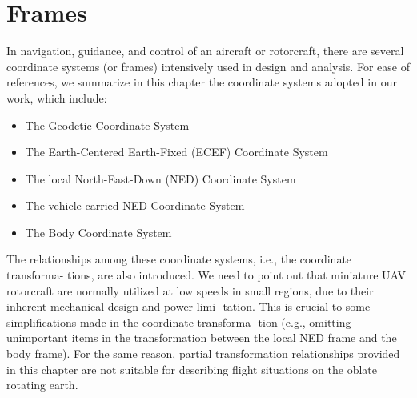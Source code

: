 \chapter{Frames}\label{ch:frames}

In navigation, guidance, and control of an aircraft or rotorcraft, there are several
coordinate systems (or frames) intensively used in design and analysis. For ease of references, we summarize in this chapter the coordinate systems
adopted in our work, which include:

\begin{itemize}
\item{The Geodetic Coordinate System}
\item{The Earth-Centered Earth-Fixed (ECEF) Coordinate System}
\item{The local North-East-Down (NED) Coordinate System}
\item{The vehicle-carried NED Coordinate System}
\item{The Body Coordinate System}
\end{itemize}

The relationships among these coordinate systems, i.e., the coordinate transforma-
tions, are also introduced.
We need to point out that miniature UAV rotorcraft are normally utilized at low
speeds in small regions, due to their inherent mechanical design and power limi-
tation. This is crucial to some simplifications made in the coordinate transforma-
tion (e.g., omitting unimportant items in the transformation between the local NED
frame and the body frame). For the same reason, partial transformation relationships
provided in this chapter are not suitable for describing flight situations on the oblate
rotating earth.
